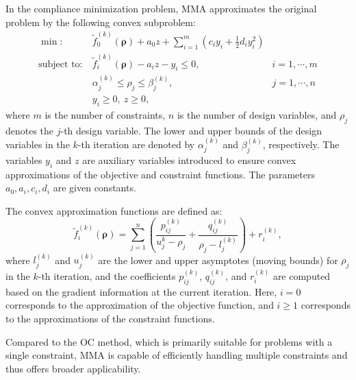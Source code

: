 \documentclass[mathpazo]{cicp}
\begin{document}
In the compliance minimization problem, MMA approximates the original problem by the following convex subproblem:
\begin{equation*}
	\begin{aligned}
		\min:
		&~\tilde{f}_0^{(k)}(\boldsymbol{\rho}) + a_0z + \sum_{i=1}^m(c_iy_i+\frac{1}{2}d_iy_i^2)\\
		\text{subject~to}:
		&~\tilde{f}_i^{(k)}(\boldsymbol{\rho}) - a_iz - y_i \leq 0,\quad&{i}=1,\cdots,m\\
		&~\alpha_j^{(k)}\leq{\rho}_j\leq\beta_j^{(k)},\quad&{j}=1,\cdots,n\\
		&~{y}_i\geq0,~z\geq0,
	\end{aligned}
\end{equation*}
where $m$ is the number of constraints, $n$ is the number of design variables, and $\rho_j$ denotes the $j$-th design variable. The lower and upper bounds of the design variables in the $k$-th iteration are denoted by $\alpha_j^{(k)}$ and $\beta_j^{(k)}$, respectively. The variables $y_i$ and $z$ are auxiliary variables introduced to ensure convex approximations of the objective and constraint functions. The parameters $a_0, a_i, c_i, d_i$ are given constants. 

The convex approximation functions are defined as: 
\begin{equation*}
	\tilde{f}_i^{(k)}(\boldsymbol{\rho}) = \sum_{j=1}^n\left(\frac{p_{ij}^{(k)}}{u_{j}^k-\rho_j} + \frac{q_{ij}^{(k)}}{\rho_{j}-l_j^{(k)}}\right) + r_i^{(k)},
\end{equation*}
where $l_j^{(k)}$ and $u_j^{(k)}$ are the lower and upper asymptotes (moving bounds) for $\rho_j$ in the $k$-th iteration, and the coefficients $p_{ij}^{(k)}$, $q_{ij}^{(k)}$, and $r_i^{(k)}$ are computed based on the gradient information at the current iteration. Here, $i = 0$ corresponds to the approximation of the objective function, and $i \geq 1$ corresponds to the approximations of the constraint functions.

Compared to the OC method, which is primarily suitable for problems with a single constraint, MMA is capable of efficiently handling multiple constraints and thus offers broader applicability.
\end{document}
